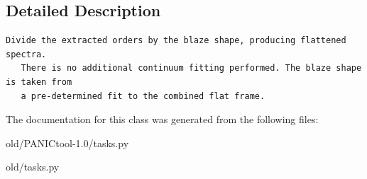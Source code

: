 \subsection{Detailed Description}


\footnotesize\begin{verbatim}Divide the extracted orders by the blaze shape, producing flattened spectra.
   There is no additional continuum fitting performed. The blaze shape is taken from
   a pre-determined fit to the combined flat frame.
\end{verbatim}
\normalsize
 



The documentation for this class was generated from the following files:\begin{CompactItemize}
\item 
old/PANICtool-1.0/tasks.py\item 
old/tasks.py\end{CompactItemize}
